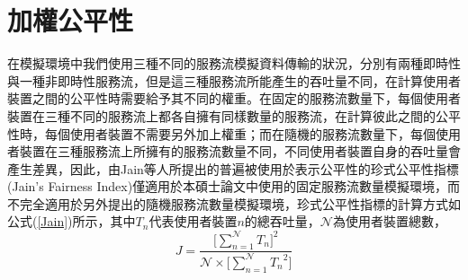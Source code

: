 \clearpage
\section{加權公平性}
在模擬環境中我們使用三種不同的服務流模擬資料傳輸的狀況，分別有兩種即時性與一種非即時性服務流，但是這三種服務流所能產生的吞吐量不同，在計算使用者裝置之間的公平性時需要給予其不同的權重。在固定的服務流數量下，每個使用者裝置在三種不同的服務流上都各自擁有同樣數量的服務流，在計算彼此之間的公平性時，每個使用者裝置不需要另外加上權重；而在隨機的服務流數量下，每個使用者裝置在三種服務流上所擁有的服務流數量不同，不同使用者裝置自身的吞吐量會產生差異，因此，由Jain等人所提出的普遍被使用於表示公平性的珍式公平性指標(Jain's Fairness Index)\cite{jain1984}僅適用於本碩士論文中使用的固定服務流數量模擬環境，而不完全適用於另外提出的隨機服務流數量模擬環境，珍式公平性指標的計算方式如公式(\ref{Jain})所示，其中$T_n$代表使用者裝置$n$的總吞吐量，$\mathcal{N}$為使用者裝置總數，
\begin{equation}
\label{Jain}
J=\dfrac{\Bigg[\sum\limits_{n=1}^\mathcal{N} T_n\Bigg]^2}{\mathcal{N}\times\Bigg[\sum\limits_{n=1}^\mathcal{N}{T_n}^2\Bigg]}
\end{equation}

